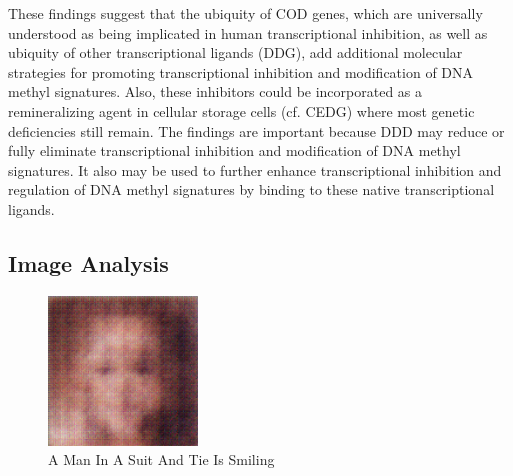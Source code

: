 \documentclass{article}%
\begin{document}
These findings suggest that the ubiquity of COD genes, which are universally understood as being implicated in human transcriptional inhibition, as well as ubiquity of other transcriptional ligands (DDG), add additional molecular strategies for promoting transcriptional inhibition and modification of DNA methyl signatures. Also, these inhibitors could be incorporated as a remineralizing agent in cellular storage cells (cf. CEDG) where most genetic deficiencies still remain.\newline%
The findings are important because DDD may reduce or fully eliminate transcriptional inhibition and modification of DNA methyl signatures. It also may be used to further enhance transcriptional inhibition and regulation of DNA methyl signatures by binding to these native transcriptional ligands.

%
\subsection{Image Analysis}%
\label{subsec:ImageAnalysis}%


\begin{figure}[h!]%
\centering%
\includegraphics[width=150px]{500_fake_images/samples_5_79.png}%
\caption{A Man In A Suit And Tie Is Smiling}%
\end{figure}

%
\end{document}
